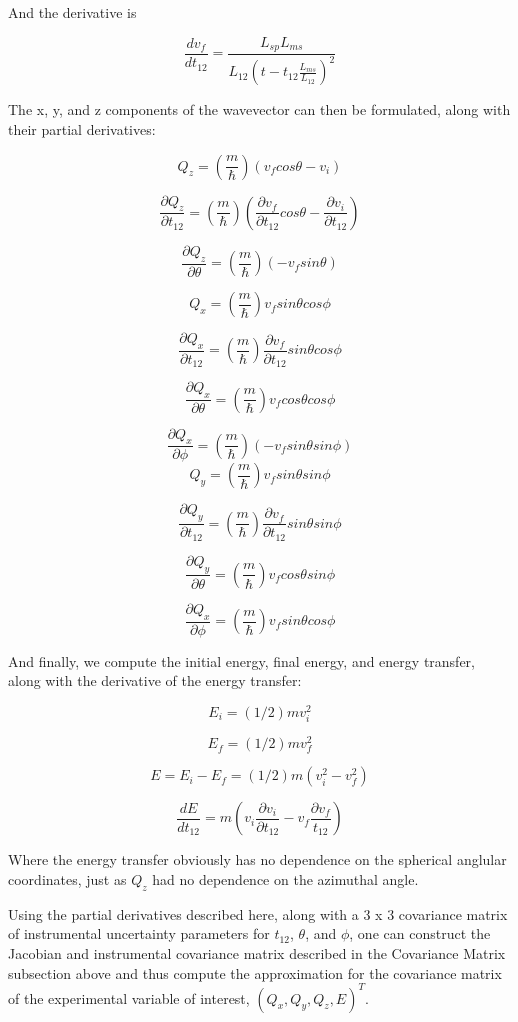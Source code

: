 \documentclass[aps,prl,twocolumn,groupedaddress]{revtex4-1}
\begin{document}
And the derivative is

$$
\frac{dv_f}{dt_{12}} = \frac{L_{sp} L_{ms}}{L_{12}(t - t_{12} \frac{L_{ms}}{L_{12}})^2}
$$

The x, y, and z components of the wavevector can then be formulated, along with their partial derivatives:

$$
Q_z = \left( \frac{m}{\hbar} \right)(v_f cos \theta - v_i)
$$

$$
\frac{\partial Q_z}{\partial t_{12}} = \left( \frac{m}{\hbar} \right)(\frac{\partial v_f}{\partial t_{12}} cos \theta - \frac{\partial v_i}{\partial t_{12}})
$$

$$
\frac{\partial Q_z}{\partial \theta} = \left( \frac{ m}{\hbar} \right)(- v_f sin \theta )
$$

$$
Q_x = \left( \frac{m}{\hbar} \right)v_f sin \theta cos \phi
$$

$$
\frac{\partial Q_x}{\partial t_{12}} = \left( \frac{m}{\hbar} \right)\frac{\partial v_f}{\partial t_{12}} sin \theta cos \phi
$$

$$
\frac{\partial Q_x}{\partial \theta} = \left( \frac{m}{\hbar} \right)v_f cos \theta cos \phi
$$

$$
\frac{\partial Q_x}{\partial \phi} = \left( \frac{m}{\hbar} \right)(- v_f sin \theta sin \phi)
$$
$$
Q_y = \left( \frac{m}{\hbar} \right)v_f sin \theta sin \phi
$$

$$
\frac{\partial Q_y}{\partial t_{12}} = \left( \frac{m}{\hbar} \right)\frac{\partial v_f}{\partial t_{12}} sin \theta sin \phi
$$

$$
\frac{\partial Q_y}{\partial \theta} = \left( \frac{m}{\hbar} \right)v_f cos \theta sin \phi
$$

$$
\frac{\partial Q_x}{\partial \phi} = \left( \frac{m}{\hbar} \right) v_f sin \theta cos \phi
$$

And finally, we compute the initial energy, final energy, and energy transfer, along with the derivative of the energy transfer:

$$
E_i = (1/2)m v_i^2
$$

$$
E_f = (1/2)m v_f^2
$$

$$
E = E_i - E_f = (1/2)m(v_i^2 - v_f^2)
$$

$$
\frac{dE}{dt_{12}} = m \left(v_i \frac{\partial v_i}{\partial t_{12}} - v_f \frac{\partial v_f}{t_{12}} \right)
$$

Where the energy transfer obviously has no dependence on the spherical anglular coordinates, just as $Q_z$ had no dependence on the azimuthal angle.

Using the partial derivatives described here, along with a 3 x 3 covariance matrix of instrumental uncertainty parameters for $t_{12}$, $\theta$, and $\phi$, one can construct the Jacobian and instrumental covariance matrix described in the Covariance Matrix subsection above and thus compute the approximation for the covariance matrix of the experimental variable of interest, $(Q_x, Q_y, Q_z, E)^T$.
\end{document}

